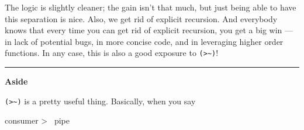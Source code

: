 \documentclass[]{article}
\newenvironment{Shaded}{}{}
\newcommand{\CommentTok}[1]{\textcolor[rgb]{0.38,0.63,0.69}{\textit{#1}}}
\newcommand{\DataTypeTok}[1]{\textcolor[rgb]{0.56,0.13,0.00}{#1}}
\newcommand{\FunctionTok}[1]{\textcolor[rgb]{0.02,0.16,0.49}{#1}}
\newcommand{\KeywordTok}[1]{\textcolor[rgb]{0.00,0.44,0.13}{\textbf{#1}}}
\newcommand{\NormalTok}[1]{#1}
\newcommand{\OtherTok}[1]{\textcolor[rgb]{0.00,0.44,0.13}{#1}}
\begin{document}
\begin{Shaded}
\end{Shaded}

The logic is slightly cleaner; the gain isn't that much, but just being able to
have this separation is nice. Also, we get rid of explicit recursion. And
everybody knows that every time you can get rid of explicit recursion, you get a
big win --- in lack of potential bugs, in more concise code, and in leveraging
higher order functions. In any case, this is also a good exposure to
\texttt{(\textgreater{}\textasciitilde{})}!

\begin{center}\rule{0.5\linewidth}{\linethickness}\end{center}

\textbf{Aside}

\texttt{(\textgreater{}\textasciitilde{})} is a pretty useful thing. Basically,
when you say

\begin{Shaded}
\begin{Highlighting}[]
\NormalTok{consumer }\FunctionTok{>~}\NormalTok{ pipe}
\end{Highlighting}
\end{Shaded}
\end{document}
